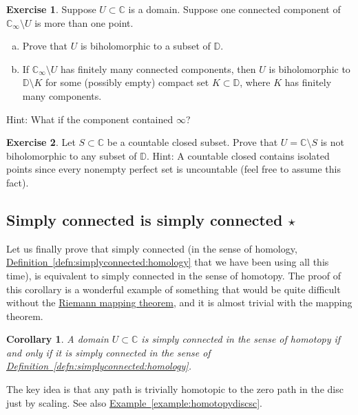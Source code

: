\documentclass[12pt,openany]{book}
\newcommand{\C}{{\mathbb{C}}}
\newcommand{\D}{{\mathbb{D}}}
\theoremstyle{plain}
\newtheorem{cor}[thm]{Corollary}
\theoremstyle{remark}
\theoremstyle{definition}
\newenvironment{exbox}{%
    \def\FrameCommand{\vrule width 1pt \relax\hspace{10pt}}%
    \MakeFramed{\advance\hsize-\width\FrameRestore}%
}{%
    \endMakeFramed
}
\newenvironment{exparts}{%
    \leavevmode\begin{enumerate}[a),noitemsep,topsep=0pt,parsep=0pt,partopsep=0pt]
}{%
    \end{enumerate}
}
\theoremstyle{exercise}
\newtheorem{exercise}{Exercise}[section]
\theoremstyle{example}
\newcommand{\exampleref}[1]{\hyperref[#1]{Example~\ref*{#1}}}
\newcommand{\defnref}[1]{\hyperref[#1]{Definition~\ref*{#1}}}
\begin{document}
\begin{exbox}
\begin{exercise}
Suppose $U \subset \C$ is a domain.  Suppose one connected component of $\C_\infty
\setminus U$ is more than one point.
\begin{exparts}
\item
Prove that $U$ is biholomorphic to a subset of $\D$.
\item
If $\C_\infty \setminus U$ has finitely many connected components, then
$U$ is biholomorphic to $\D \setminus K$ for some (possibly empty) compact set
$K \subset \D$, where $K$ has finitely many components.
\end{exparts}
Hint: What if the component contained $\infty$?
\end{exercise}

\begin{exercise}
Let $S \subset \C$ be a countable closed subset.
Prove that $U = \C \setminus S$ is not biholomorphic
to any subset of $\D$.  Hint: A countable closed contains isolated points
since every nonempty perfect set is uncountable
(feel free to assume this fact).
\end{exercise}
\end{exbox}

\subsection{Simply connected is simply connected \texorpdfstring{$\star$}{*}}

Let us finally prove that simply connected (in the sense of homology,
\defnref{defn:simplyconnected:homology} that we have been using all this
time), is equivalent to simply connected in the sense of homotopy.
The proof of this corollary is a wonderful example of something that would
be quite difficult without the
\hyperref[thm:RMT]{Riemann mapping theorem}, and it is almost
trivial with the mapping theorem.

\begin{cor} \label{cor:simplyconnhard}
A domain $U \subset \C$ is simply connected in the sense of homotopy
if and only if
it is simply connected in the sense of \defnref{defn:simplyconnected:homology}.
\end{cor}

The key idea is that any path is trivially homotopic to the zero path in the
disc just by scaling.  See also \exampleref{example:homotopydiscsc}.
\end{document}
